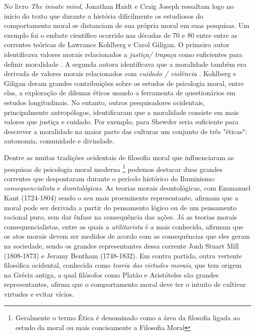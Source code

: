 No livro \textit{The innate mind}\cite{Haidt2007a}, Jonathan Haidt e Craig
Joseph ressaltam logo no início do texto que durante a história dificilmente
os estudiosos do comportamento moral se distanciam de sua própria moral em
suas pesquisas. Um exemplo foi o embate científico ocorrido nas décadas de 70
e 80 entre entre as correntes teóricas de Lawrance Kohlberg e Carol Giligan.
O primeiro autor identificava  valores morais relacionados a \textit{justiça/
trapaça} como suficientes para definir moralidade \citep{Kohlberg1969}. A
segunda autora identificava que a moralidade também era derivada de valores
morais relacionados com \textit{cuidado / violência} \citep{Gilligan1982}.
Kohlberg e Giligan deram grandes contribuições sobre os estudos de psicologia
moral, entre elas, a exploração de dilemas éticos usando a ferramenta de
questionários em estudos longitudinais. No entanto, outros pesquisadores
ocidentais, principalmente antropólogos, identificaram que a moralidade
consiste em mais valores que justiça e cuidado. Por exemplo, para Shewder
\citep{Shweder1997a} seria suficiente para descrever a moralidade na maior
parte das culturas um conjunto de três "éticas": autonomia, comunidade
e divindade.

Dentre as muitas tradições ocidentais de filosofia moral
que influenciaram as pesquisas de psicologia moral moderna
\footnote{Geralmente o termo Ética é denominado como a área da
filosofia ligada ao estudo da moral ou mais concisamente a Filosofia
Moral} podemos destacar duas grandes correntes que despontaram durante
o período histórico do Iluminismo: \textit{consequencialista} e
\textit{deontológicas}.
As teorias morais deontológicas, com Emmanuel Kant (1724-1804) sendo o seu
mais proeminente representante, afirmam que a moral pode ser derivada a partir
do pensamento lógico ou de um pensamento racional puro, sem dar ênfase na
consequência das ações. Já as teorias morais consequencialistas, entre
as quais a \textit{utilitarista} é a mais conhecida, afirmam que os atos
morais devem ser medidos de acordo com as consequências que eles geram
na sociedade, sendo os grandes representantes dessa corrente Jonh Stuart
Mill (1808-1873) e Jeramy Bentham (1748-1832).  Em contra partida, outra
vertente filosófica ocidental, conhecida como \textit{teoria das virtudes
morais}, que tem origem na Grécia antiga, a qual filósofos como Platão e
Aristóteles são grandes representantes, afirma que o comportamento moral
deve ter o intuito de cultivar virtudes e evitar vícios.

